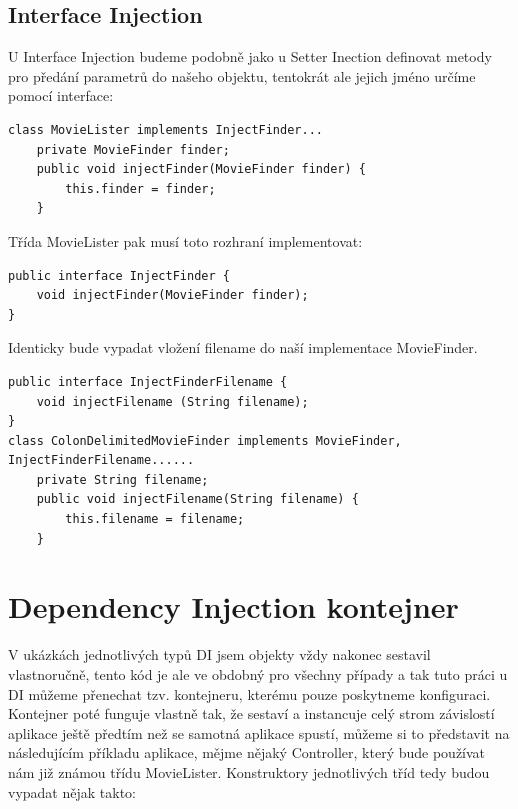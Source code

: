 \documentclass[a4paper,conference]{IEEEtran}
\begin{document}
\subsection{Interface Injection}

U Interface Injection budeme podobně jako u Setter Inection definovat metody pro předání parametrů do našeho objektu, tentokrát ale jejich jméno určíme pomocí interface:

\lstset{language=Java,caption=Třída MovieLister implementující definované rozhraní,label=listing:Java}
\begin{lstlisting}
class MovieLister implements InjectFinder...
    private MovieFinder finder;
    public void injectFinder(MovieFinder finder) {
        this.finder = finder;
    }
\end{lstlisting}

Třída MovieLister pak musí toto rozhraní implementovat:

\lstset{language=Java,caption=Interface pro interface injection,label=listing:Java}
\begin{lstlisting}
public interface InjectFinder {
    void injectFinder(MovieFinder finder);
}
\end{lstlisting}

Identicky bude vypadat vložení filename do naší implementace MovieFinder.

\lstset{language=Java,caption=Implementace MovieLister u InterfaceInjection,label=listing:Java}
\begin{lstlisting}
public interface InjectFinderFilename {
    void injectFilename (String filename);
}
class ColonDelimitedMovieFinder implements MovieFinder, InjectFinderFilename......
    private String filename;
    public void injectFilename(String filename) {
        this.filename = filename;
    }
\end{lstlisting}

\section{Dependency Injection kontejner}
\label{sec:Container}

V ukázkách jednotlivých typů DI jsem objekty vždy nakonec sestavil vlastnoručně, tento kód je ale ve obdobný pro všechny případy a tak tuto práci u DI můžeme přenechat tzv. kontejneru, kterému pouze poskytneme konfiguraci. Kontejner poté funguje vlastně tak, že sestaví a instancuje celý strom závislostí aplikace ještě předtím než se samotná aplikace spustí, můžeme si to představit na následujícím příkladu aplikace, mějme nějaký Controller, který bude používat nám již známou třídu MovieLister. Konstruktory jednotlivých tříd tedy budou vypadat nějak takto:
\end{document}
